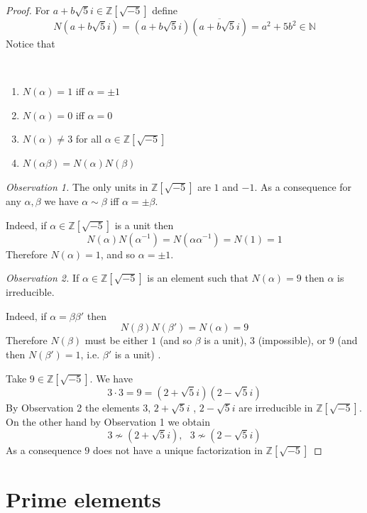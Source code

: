\documentclass[12pt, letterpaper, oneside]{article}
\theoremstyle{plain}
\theoremstyle{definition}
\newcommand{\N}{{\mathbb N}}
\newcommand{\Z}{{\mathbb Z}}
\newcommand{\benu}{\begin{enumerate}}
\newcommand{\eenu}{\end{enumerate}}
\newcommand{\vs}{\vskip 5mm}
\newcommand{\isep}[1][0]{\setlength{\itemsep}{#1 mm}}
\begin{document}
\begin{proof}
For $a+ b\sqrt{5}i \in \Z[\sqrt{-5}]$ define 
$$N(a+ b\sqrt{5}i) = (a+ b\sqrt{5}i)(\overline{a+ b\sqrt{5}i}) = a^{2}+5b^{2}\in \N$$
Notice that

\vskip -13mm

\ 
\benu
\isep[0]
\item $N(\alpha) = 1$ iff $\alpha = \pm 1$
\item $N(\alpha) = 0$ iff $\alpha = 0$
\item $N(\alpha) \neq 3$ for all $\alpha\in \Z[\sqrt{-5}]$
\item $N(\alpha\beta) = N(\alpha)N(\beta)$
\eenu

\vs

\emph{Observation 1.} The only units in $\Z[\sqrt{-5}]$ are $1$ and $-1$. \newline
As a consequence for any  $\alpha, \beta$ we have 
$\alpha\sim \beta$ iff $\alpha = \pm \beta$.

\vs

Indeed, if $\alpha \in \Z[\sqrt{-5}]$ is a unit then
$$N(\alpha)N(\alpha^{-1}) = N(\alpha\alpha^{-1}) = N(1) = 1$$
Therefore $N(\alpha) =1$, and so $\alpha = \pm 1$. 




\vs\vs

\emph{Observation 2.} If $\alpha\in \Z[\sqrt{-5}]$ is an element such that $N(\alpha) =9$
then $\alpha$ is irreducible. 


Indeed, if $\alpha = \beta\beta'$ then 
$$N(\beta)N(\beta') = N(\alpha) = 9$$
Therefore $N(\beta)$ must be either  $1$ (and so $\beta$ is a unit), $3$ (impossible), or $9$
(and then $N(\beta')=1$, i.e. $\beta'$ is a unit) .


\vs\vs

Take $9\in \Z[\sqrt{-5}]$. We have
$$3\cdot 3 =9 = (2+\sqrt{5}i)(2-\sqrt{5}i)$$
By Observation 2 the elements $3$, $2+\sqrt{5}i$ , $2-\sqrt{5}i$ are irreducible in $\Z[\sqrt{-5}]$.
On the other hand by Observation 1 we obtain 
$$3\not\sim (2+\sqrt{5}i), \ \ \ 3 \not\sim (2-\sqrt{5}i)$$
As a consequence $9$ does not have a unique factorization in $\Z[\sqrt{-5}]$
\end{proof}





\newpage
\section{Prime elements}
\label{SEC_PRIMEELTS}
\end{document}
